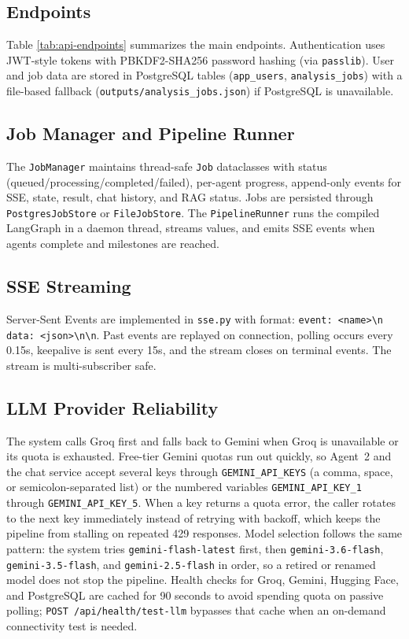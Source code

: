 \documentclass[12pt,a4paper,openany]{report}
\begin{document}
\subsection{Endpoints}
Table \ref{tab:api-endpoints} summarizes the main endpoints. Authentication uses JWT-style tokens with PBKDF2-SHA256 password hashing (via \texttt{passlib}). User and job data are stored in PostgreSQL tables (\texttt{app\_users}, \texttt{analysis\_jobs}) with a file-based fallback (\texttt{outputs/analysis\_jobs.json}) if PostgreSQL is unavailable.

\subsection{Job Manager and Pipeline Runner}
The \texttt{JobManager} maintains thread-safe \texttt{Job} dataclasses with status (queued/processing/completed/failed), per-agent progress, append-only events for SSE, state, result, chat history, and RAG status. Jobs are persisted through \texttt{PostgresJobStore} or \texttt{FileJobStore}. The \texttt{PipelineRunner} runs the compiled LangGraph in a daemon thread, streams values, and emits SSE events when agents complete and milestones are reached.

\subsection{SSE Streaming}
Server-Sent Events are implemented in \texttt{sse.py} with format: \verb|event: <name>\n data: <json>\n\n|. Past events are replayed on connection, polling occurs every 0.15s, keepalive is sent every 15s, and the stream closes on terminal events. The stream is multi-subscriber safe.

\subsection{LLM Provider Reliability}
The system calls Groq first and falls back to Gemini when Groq is unavailable or its quota is exhausted. Free-tier Gemini quotas run out quickly, so Agent~2 and the chat service accept several keys through \texttt{GEMINI\_API\_KEYS} (a comma, space, or semicolon-separated list) or the numbered variables \texttt{GEMINI\_API\_KEY\_1} through \texttt{GEMINI\_API\_KEY\_5}. When a key returns a quota error, the caller rotates to the next key immediately instead of retrying with backoff, which keeps the pipeline from stalling on repeated 429 responses. Model selection follows the same pattern: the system tries \texttt{gemini-flash-latest} first, then \texttt{gemini-3.6-flash}, \texttt{gemini-3.5-flash}, and \texttt{gemini-2.5-flash} in order, so a retired or renamed model does not stop the pipeline. Health checks for Groq, Gemini, Hugging Face, and PostgreSQL are cached for 90 seconds to avoid spending quota on passive polling; \texttt{POST /api/health/test-llm} bypasses that cache when an on-demand connectivity test is needed.
\end{document}
